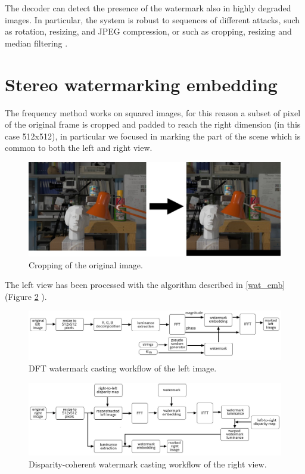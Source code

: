 The decoder can detect the presence of the watermark also in highly degraded images. In particular, the system is robust to sequences of different attacks, such as rotation, resizing, and JPEG compression, or such as cropping, resizing and median filtering \cite{PIVA}.

\section{Stereo watermarking embedding}

The frequency method works on squared images, for this reason a subset of pixel of the original frame is cropped and padded to reach the right dimension (in this case 512x512), in particular we focused in marking the part of the scene which is common to both the left and right view.

\begin{figure}[h!]
\centering
\includegraphics[width=1\textwidth]{./img/cropping.jpg}
\caption{\small{Cropping of the original image.}}
\label{fig:cropped}
\end{figure}

The left view has been processed with the algorithm described in \ref{wat_emb} (Figure \ref{fig:left_wat} ).\newline 


\begin{figure}[h!]
\centering
\includegraphics[width=1\textwidth]{./img/left_wat.jpg}
\caption{\small{DFT watermark casting workflow of the left image.}\label{fig:left_wat}}

\end{figure}


\begin{figure}[h!]
\centering
\includegraphics[width=1\textwidth]{./img/pros.jpg}
\caption{\small{Disparity-coherent watermark casting workflow of the right view.}}
\label{fig:right_wat}
\end{figure}


